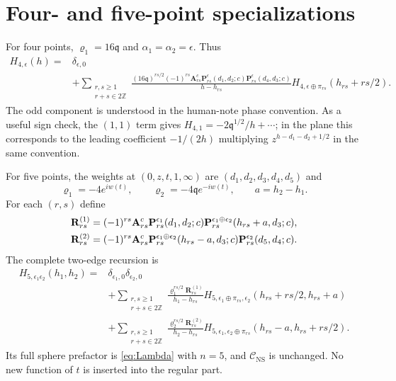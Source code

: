 \documentclass[11pt]{article}
\numberwithin{equation}{section}
\newcommand{\NS}{\mathrm{NS}}
\newcommand{\fq}{\mathfrak q}
\newcommand{\cC}{\mathcal C}
\begin{document}
\section{Four- and five-point specializations}
\label{sec:examples}

For four points, $\varrho_1=16\fq$ and
$\alpha_1=\alpha_2=\epsilon$. Thus
\begin{equation}
 \begin{aligned}
 H_{4,\epsilon}(h)={}&\delta_{\epsilon,0}\\
 &+\sum_{\substack{r,s\geq1\\r+s\in2\mathbb Z}}
 \frac{(16\fq)^{rs/2}(-1)^{rs}\mathbf A^c_{rs}
       \mathbf P^\epsilon_{rs}(d_1,d_2;c)
       \mathbf P^\epsilon_{rs}(d_4,d_3;c)}{h-h_{rs}}
 H_{4,\epsilon\oplus\pi_{rs}}(h_{rs}+rs/2).
 \end{aligned}
 \label{eq:four-recursion}
\end{equation}
The odd component is understood in the human-note phase convention.
As a useful sign check, the $(1,1)$ term
gives $H_{4,1}=-2\fq^{1/2}/h+\cdots$; in the plane this corresponds
to the leading coefficient $-1/(2h)$ multiplying
$z^{h-d_1-d_2+1/2}$ in the same convention.

For five points, the weights at $(0,z,t,1,\infty)$ are
$(d_1,d_2,d_3,d_4,d_5)$ and
\begin{equation}
 \varrho_1=-4e^{iw(t)},\qquad
 \varrho_2=-4\fq e^{-iw(t)},\qquad a=h_2-h_1.
\end{equation}
For each $(r,s)$ define
\begin{align}
 \mathbf R^{(1)}_{rs}
 &=(-1)^{rs}\mathbf A^c_{rs}
   \mathbf P^{\epsilon_1}_{rs}(d_1,d_2;c)
   \mathbf P^{\epsilon_1\oplus\epsilon_2}_{rs}(h_{rs}+a,d_3;c),
 \notag\\
 \mathbf R^{(2)}_{rs}
 &=(-1)^{rs}\mathbf A^c_{rs}
   \mathbf P^{\epsilon_1\oplus\epsilon_2}_{rs}(h_{rs}-a,d_3;c)
   \mathbf P^{\epsilon_2}_{rs}(d_5,d_4;c).
\end{align}
The complete two-edge recursion is
\begin{equation}
 \boxed{\begin{aligned}
 H_{5,\epsilon_1\epsilon_2}(h_1,h_2)
 ={}&\delta_{\epsilon_1,0}\delta_{\epsilon_2,0}\\
 &+\sum_{\substack{r,s\geq1\\r+s\in2\mathbb Z}}
 \frac{\varrho_1^{rs/2}\mathbf R^{(1)}_{rs}}{h_1-h_{rs}}
 H_{5,\epsilon_1\oplus\pi_{rs},\epsilon_2}
       (h_{rs}+rs/2,h_{rs}+a)\\
 &+\sum_{\substack{r,s\geq1\\r+s\in2\mathbb Z}}
 \frac{\varrho_2^{rs/2}\mathbf R^{(2)}_{rs}}{h_2-h_{rs}}
 H_{5,\epsilon_1,\epsilon_2\oplus\pi_{rs}}
       (h_{rs}-a,h_{rs}+rs/2).
 \end{aligned}}
 \label{eq:five-recursion}
\end{equation}
Its full sphere prefactor is \eqref{eq:Lambda} with $n=5$, and
$\cC_{\NS}$ is unchanged. No new function of $t$ is inserted into the
regular part.
\end{document}
